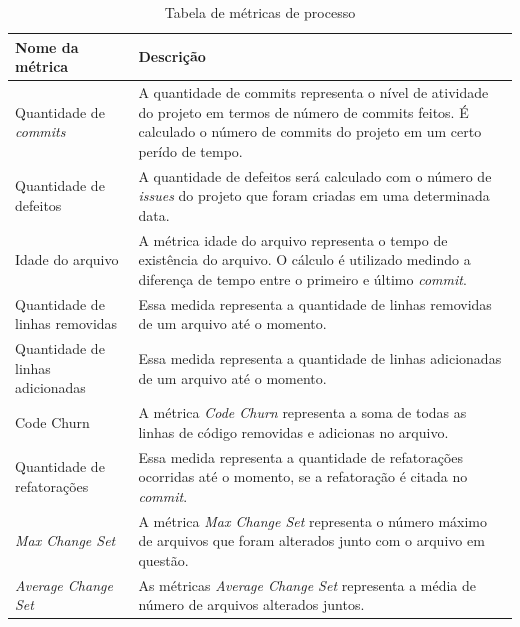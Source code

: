 \begin{table}[]
\centering
\caption{Tabela de métricas de processo}
\label{my-label}
\begin{tabular}{|p{3cm}|p{12cm}|}
\hline
Nome da métrica                  & Descrição                                                                                                                                                                         \\ \hline
Quantidade de \textit{commits}            & A quantidade de commits representa o nível de atividade do projeto em termos de número de commits feitos. É calculado o número de commits do projeto em um certo perído de tempo. \\ \hline
Quantidade de defeitos           & A quantidade de defeitos será calculado com o número de \textit{issues} do projeto que foram criadas em uma determinada data.                                                              \\ \hline
Idade do arquivo             & A métrica idade do arquivo representa o tempo de existência do arquivo. O cálculo é utilizado medindo a diferença de tempo entre o primeiro e último \textit{commit}.                  \\ \hline
Quantidade de linhas removidas   & Essa medida representa a quantidade de linhas removidas de um arquivo até o momento.                                                                                              \\ \hline
Quantidade de linhas adicionadas & Essa medida representa a quantidade de linhas adicionadas de um arquivo até o momento.                                                                                            \\ \hline
Code Churn                       & A métrica \textit{Code Churn} representa a soma de todas as linhas de código removidas e adicionas no arquivo.                                                                             \\ \hline
Quantidade de refatorações       & Essa medida representa a quantidade de refatorações ocorridas até o momento, se a refatoração é citada no \textit{commit}.                                                                 \\ \hline
\textit{Max Change Set}                   & A métrica \textit{Max Change Set} representa o número máximo de arquivos que foram alterados junto com o arquivo em questão.                                                               \\ \hline
\textit{Average Change Set}               & As métricas \textit{Average Change Set} representa a média de número de arquivos alterados juntos.                                                                                         \\ \hline
\end{tabular}
\end{table}
